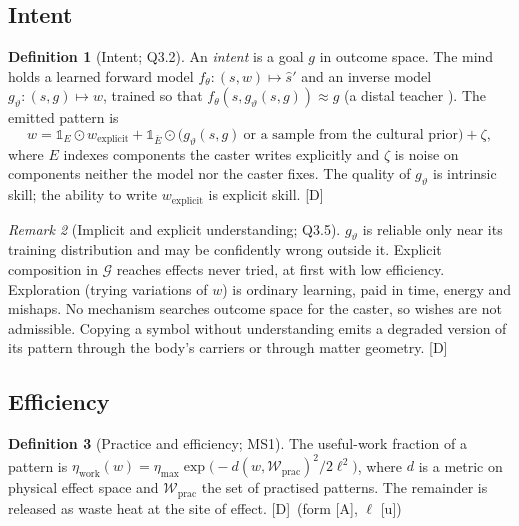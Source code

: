 \documentclass[11pt,a4paper]{article}
\numberwithin{equation}{section}
\theoremstyle{definition}
\newtheorem{definition}{Definition}[section]
\theoremstyle{plain}
\theoremstyle{remark}
\newtheorem{remark}[definition]{Remark}
\newcommand{\tagD}{\textcolor{tag}{\textsf{[D]}}}
\newcommand{\tagA}{\textcolor{tag}{\textsf{[A]}}}
\newcommand{\tagU}{\textcolor{tag}{\textsf{[u]}}}
\begin{document}
\subsection{Intent}
\begin{definition}[Intent; Q3.2]\label{def:intent}
An \emph{intent} is a goal $g$ in outcome space. The mind holds a learned forward model $f_\theta:(s,w)\mapsto \hat s'$ and an inverse model $g_\vartheta:(s,g)\mapsto w$, trained so that $f_\theta(s,g_\vartheta(s,g))\approx g$ (a distal teacher \cite{jordan}). The emitted pattern is
\begin{equation}
w = \mathbb 1_{E}\odot w_{\text{explicit}}+\mathbb 1_{\bar E}\odot\big(g_\vartheta(s,g)\ \text{or a sample from the cultural prior}\big)+\zeta,
\end{equation}
where $E$ indexes components the caster writes explicitly and $\zeta$ is noise on components neither the model nor the caster fixes. The quality of $g_\vartheta$ is intrinsic skill; the ability to write $w_{\text{explicit}}$ is explicit skill. \tagD
\end{definition}
\begin{remark}[Implicit and explicit understanding; Q3.5]
$g_\vartheta$ is reliable only near its training distribution and may be confidently wrong outside it. Explicit composition in $\mathcal G$ reaches effects never tried, at first with low efficiency. Exploration (trying variations of $w$) is ordinary learning, paid in time, energy and mishaps. No mechanism searches outcome space for the caster, so wishes are not admissible. Copying a symbol without understanding emits a degraded version of its pattern through the body's carriers or through matter geometry. \tagD
\end{remark}

\subsection{Efficiency}
\begin{definition}[Practice and efficiency; MS1]
The useful-work fraction of a pattern is $\eta_{\text{work}}(w)=\eta_{\max}\exp\!\big(-d(w,\mathcal W_{\text{prac}})^2/2\ell^2\big)$, where $d$ is a metric on physical effect space and $\mathcal W_{\text{prac}}$ the set of practised patterns. The remainder is released as waste heat at the site of effect. \tagD\ (form \tagA, $\ell$ \tagU)
\end{definition}
\end{document}
